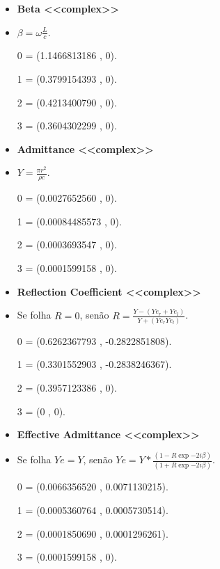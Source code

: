 \documentclass[10pt,aspectratio=169]{beamer}
\theoremstyle{remark}
\theoremstyle{definition}
\begin{document}
\begin{frame}[allowframebreaks]
\begin{itemize}
		\end{itemize}
		
		\framebreak
		
		\begin{itemize}
		\item \textbf{Beta <<complex>>}
		\item $ \beta = \omega \frac{L}{c}$.
		\item [0] = (1.1466813186  ,  0).
		\item [1] = (0.3799154393  ,  0).
		\item [2] = (0.4213400790  ,  0).
		\item [3] = (0.3604302299  ,  0).
		
		\end{itemize}
		
		\framebreak
		
		\begin{itemize}
		\item \textbf{Admittance <<complex>>}
		\item $ Y = \frac{\pi r^2}{\rho c}$.
		\item [0] = (0.0027652560  ,  0).
		\item [1] = (0.00084485573 ,  0).
		\item [2] = (0.0003693547  ,  0).
		\item [3] = (0.0001599158  ,  0).
		
		\end{itemize}
		
		\framebreak
		
		\begin{itemize}
		\item \textbf{Reflection Coefficient <<complex>>}
		\item Se folha $ R = 0 $, senão $ R = \frac{Y - (Ye_r + Ye_l)}{Y + (Ye_r Ye_l)}$.
		\item [0] = (0.6262367793  ,  -0.2822851808).
		\item [1] = (0.3301552903  ,  -0.2838246367).
		\item [2] = (0.3957123386  ,  0).
		\item [3] = (0             ,  0).
		
		\end{itemize}
		
		\framebreak

	\begin{itemize}
		\item \textbf{Effective Admittance <<complex>>}
		\item Se folha $ Ye = Y $, senão $ Ye = Y * \frac{(1 - R\exp{-2i\beta})}{(1 + R\exp{-2i\beta})}$.
		\item [0] = (0.0066356520  ,  0.0071130215).
		\item [1] = (0.0005360764  ,  0.0005730514).
		\item [2] = (0.0001850690  ,  0.0001296261).
		\item [3] = (0.0001599158  ,  0).
	

\end{itemize}
\end{frame}
\end{document}
